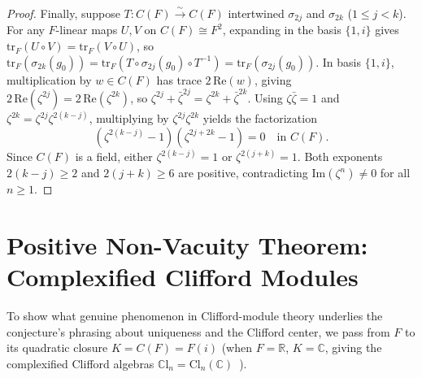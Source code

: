 \documentclass[11pt,a4paper]{article}
\theoremstyle{plain}
\theoremstyle{definition}
\newcommand{\Cl}{\mathrm{Cl}}
\newcommand{\CCl}{\mathbb{C}\mathrm{l}}
\newcommand{\R}{\mathbb{R}}
\newcommand{\C}{\mathbb{C}}
\newcommand{\tr}{\mathrm{tr}}
\begin{document}
\begin{proof}
Finally, suppose $T : C(F) \xrightarrow{\sim} C(F)$ intertwined $\sigma_{2j}$ and $\sigma_{2k}$ ($1 \le j < k$). For any $F$-linear maps $U, V$ on $C(F) \cong F^2$, expanding in the basis $\{1, i\}$ gives $\tr_F(U \circ V) = \tr_F(V \circ U)$, so $\tr_F(\sigma_{2k}(g_0)) = \tr_F(T \circ \sigma_{2j}(g_0) \circ T^{-1}) = \tr_F(\sigma_{2j}(g_0))$. In basis $\{1, i\}$, multiplication by $w \in C(F)$ has trace $2\,\mathrm{Re}(w)$, giving $2\,\mathrm{Re}(\zeta^{2j}) = 2\,\mathrm{Re}(\zeta^{2k})$, so $\zeta^{2j} + \bar{\zeta}^{2j} = \zeta^{2k} + \bar{\zeta}^{2k}$. Using $\zeta \bar{\zeta} = 1$ and $\zeta^{2k} = \zeta^{2j}\zeta^{2(k-j)}$, multiplying by $\zeta^{2j}\zeta^{2k}$ yields the factorization
\[
  (\zeta^{2(k-j)} - 1)(\zeta^{2j+2k} - 1) = 0 \quad\text{in } C(F).
\]
Since $C(F)$ is a field, either $\zeta^{2(k-j)} = 1$ or $\zeta^{2(j+k)} = 1$. Both exponents $2(k-j) \ge 2$ and $2(j+k) \ge 6$ are positive, contradicting $\mathrm{Im}(\zeta^n) \neq 0$ for all $n \ge 1$.
\end{proof}

\section{Positive Non-Vacuity Theorem: Complexified Clifford Modules}

To show what genuine phenomenon in Clifford-module theory underlies the conjecture's phrasing about uniqueness and the Clifford center, we pass from $F$ to its quadratic closure $K = C(F) = F(i)$ (when $F = \R$, $K = \C$, giving the complexified Clifford algebras $\CCl_n = \Cl_n(\C)$~\cite{ABS64}).
\end{document}

